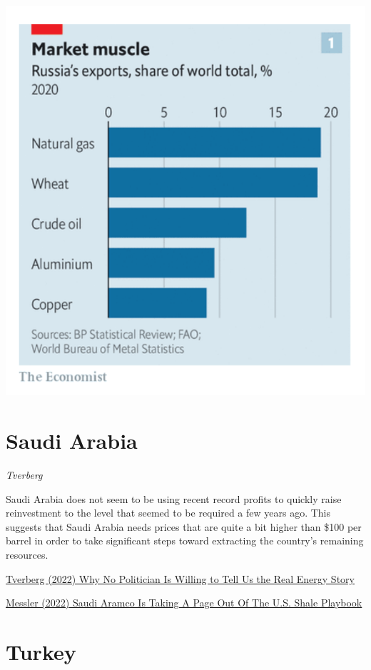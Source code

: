 \documentclass[
]{book}
\begin{document}
\includegraphics{fig/russia_share_of_world_exports.png}

\hypertarget{saudi-arabia}{%
\section{Saudi Arabia}\label{saudi-arabia}}

\emph{Tverberg}

Saudi Arabia does not seem to be using recent record profits to quickly raise reinvestment to the level that seemed to be required a few years ago. This suggests that Saudi Arabia needs prices that are quite a bit higher than \$100 per barrel in order to take significant steps toward extracting the country's remaining resources.

\href{https://ourfiniteworld.com/2022/08/23/why-no-politician-is-willing-to-tell-us-the-real-energy-story/}{Tverberg (2022) Why No Politician Is Willing to Tell Us the Real Energy Story}

\href{https://oilprice.com/Energy/Crude-Oil/Saudi-Aramco-Is-Taking-A-Page-Out-Of-The-US-Shale-Playbook.html}{Messler (2022) Saudi Aramco Is Taking A Page Out Of The U.S. Shale Playbook}

\hypertarget{turkey}{%
\section{Turkey}\label{turkey}}
\end{document}
